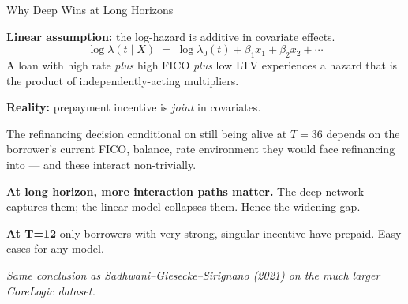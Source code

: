 \documentclass[10pt,aspectratio=169]{beamer}
\begin{document}
\begin{frame}{Why Deep Wins at Long Horizons}

    \textbf{Linear assumption:} the log-hazard is additive in covariate effects.
    $$
        \log \lambda(t \mid X) \;=\; \log \lambda_0(t) + \beta_1 x_1 + \beta_2 x_2 + \cdots
    $$
    A loan with high rate \emph{plus} high FICO \emph{plus} low LTV experiences a hazard that is the product of independently-acting multipliers.

    \vspace{0.4em}

    \textbf{Reality:} prepayment incentive is \emph{joint} in covariates.

    The refinancing decision conditional on still being alive at $T{=}36$ depends on the borrower's current FICO, balance, rate environment they would face refinancing into --- and these interact non-trivially.

    \vspace{0.4em}

    \textbf{At long horizon, more interaction paths matter.} The deep network captures them; the linear model collapses them. Hence the widening gap.

    \vspace{0.4em}

    \textbf{At T=12} only borrowers with very strong, singular incentive have prepaid. Easy cases for any model.

    \vspace{0.6em}

    \begin{center}
        \textcolor{accent}{\textit{Same conclusion as Sadhwani--Giesecke--Sirignano (2021) on the much larger CoreLogic dataset.}}
    \end{center}

\end{frame}
\end{document}
